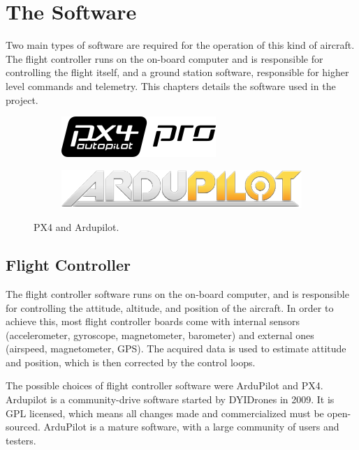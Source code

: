 \chapter{The Software} \label{chap:software}

Two main types of software are required for the operation of this kind of aircraft. The flight controller runs on the on-board computer and is responsible for controlling the flight itself, and a ground station software, responsible for higher level commands and telemetry.
This chapters details the software used in the project.

\begin{figure}[h]
  \centering
  \begin{subfigure}{.5\textwidth}
    \centering
    \includegraphics[width=\linewidth]{figs/px4.png}
  \end{subfigure}%
  \begin{subfigure}{.5\textwidth}
    \centering
    \includegraphics[width=\linewidth]{figs/ardupilot.png}

  \end{subfigure}
  \caption{PX4 and Ardupilot.}
  \label{fig:softwares}
\end{figure}


\section{Flight Controller}
The flight controller software runs on the on-board computer, and is responsible for controlling the attitude, altitude, and position of the aircraft.
%
In order to achieve this, most flight controller boards come with internal sensors (accelerometer, gyroscope, magnetometer, barometer) and external ones (airspeed, magnetometer, GPS). 
%
The acquired data is used to estimate attitude and position, which is then corrected by the control loops.

The possible choices of flight controller software were ArduPilot and PX4.
%
Ardupilot is a community-drive software started by DYIDrones in 2009\cite{diydrones}.
%
It is GPL licensed, which means all changes made and commercialized must be open-sourced\cite{gplv3}.
%
ArduPilot is a mature software, with a large community of users and testers.
%

